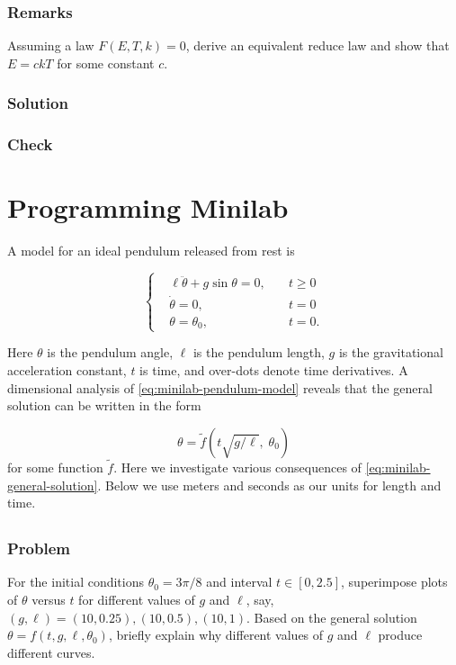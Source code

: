 \documentclass[12pt]{article}
\begin{document}
  \subsubsection*{Remarks}
  Assuming a law $F(E,T,k)=0$, derive an equivalent reduce law and show that
  $E=ckT$ for some constant $c$.

  \subsubsection*{Solution}
  \todo

  \subsubsection*{Check}
  \todo

\section{Programming Minilab}
A model for an ideal pendulum released from rest is

\begin{equation}
  \label{eq:minilab-pendulum-model}
   \left\{
  \begin{aligned}
    &\ell\ddot{\theta}+g\sin\theta = 0, \quad & t\ge0 \\
    &\dot{\theta} = 0, \quad & t = 0 \\
    &\theta = \theta_0, \quad & t = 0.
  \end{aligned}\right.
\end{equation}

Here $\theta$ is the pendulum angle, $\ell$ is the pendulum length, $g$ is the
gravitational acceleration constant, $t$ is time, and over-dots denote time
derivatives. A dimensional analysis of \cref{eq:minilab-pendulum-model} reveals
that the general solution can be written in the form

\begin{equation}
  \label{eq:minilab-general-solution}
  \theta = \tilde{f}(t\sqrt{g/\ell}, \;\theta_0)
\end{equation}
for some function $\tilde{f}$. Here we investigate various consequences of
\cref{eq:minilab-general-solution}. Below we use meters and seconds as our units
for length and time.

\subsection{}
  \label{sec:minilab-part-1}
  \subsubsection*{Problem}
  For the initial conditions $\theta_0=3\pi/8$ and interval $t\in[0,2.5]$,
  superimpose plots of $\theta$ versus $t$ for different values of $g$ and $\ell$,
  say, $(g,\ell)=(10, 0.25), (10, 0.5), (10, 1)$. Based on the general solution
  $\theta = f(t,g,\ell,\theta_0)$, briefly explain why different values of $g$ and
  $\ell$ produce different curves.
\end{document}
